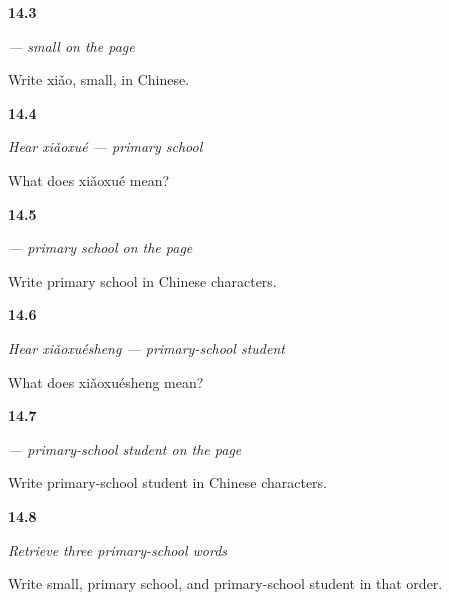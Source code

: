 \noindent\begin{minipage}[t]{\linewidth}
\raggedright
\hypertarget{review-ZH-C14-xiao-write}{\textbf{14.3}} \emph{ — small on the page}\par
\small Write xiǎo, small, in Chinese.
\end{minipage}\par\medskip

\noindent\begin{minipage}[t]{\linewidth}
\raggedright
\hypertarget{review-ZH-C14-hear-xiaoxue-meaning}{\textbf{14.4}} \emph{Hear \emph{xiǎoxué} — primary school}\par
\small What does xiǎoxué mean?
\end{minipage}\par\medskip

\noindent\begin{minipage}[t]{\linewidth}
\raggedright
\hypertarget{review-ZH-C14-xiaoxue-write}{\textbf{14.5}} \emph{ — primary school on the page}\par
\small Write primary school in Chinese characters.
\end{minipage}\par\medskip

\noindent\begin{minipage}[t]{\linewidth}
\raggedright
\hypertarget{review-ZH-C14-hear-xiaoxuesheng-meaning}{\textbf{14.6}} \emph{Hear \emph{xiǎoxuésheng} — primary-school student}\par
\small What does xiǎoxuésheng mean?
\end{minipage}\par\medskip

\noindent\begin{minipage}[t]{\linewidth}
\raggedright
\hypertarget{review-ZH-C14-xiaoxuesheng-write}{\textbf{14.7}} \emph{ — primary-school student on the page}\par
\small Write primary-school student in Chinese characters.
\end{minipage}\par\medskip

\noindent\begin{minipage}[t]{\linewidth}
\raggedright
\hypertarget{review-ZH-R14-primary-three-recall}{\textbf{14.8}} \emph{Retrieve three primary-school words}\par
\small Write small, primary school, and primary-school student in that order.
\end{minipage}\par\medskip

